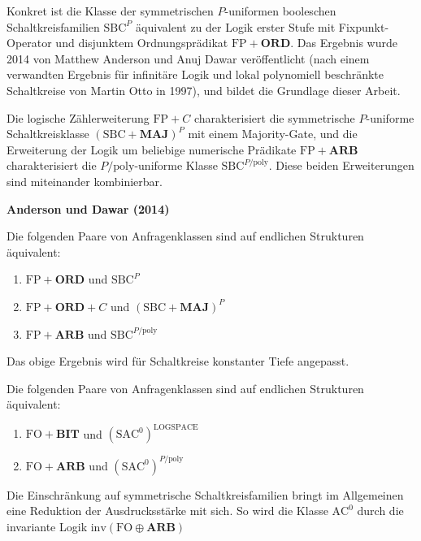 Konkret ist die Klasse der symmetrischen $P$-uniformen booleschen
Schaltkreisfamilien $\mathrm{SBC}^{P}$ äquivalent zu der Logik erster
Stufe mit Fixpunkt-Operator und disjunktem Ordnungsprädikat $\mathrm{FP}+\mathbf{ORD}$.
Das Ergebnis wurde 2014 von Matthew Anderson und Anuj Dawar\cite{AD2014}
veröffentlicht (nach einem verwandten Ergebnis für infinitäre Logik
und lokal polynomiell beschränkte Schaltkreise von Martin Otto in
1997\cite{Otto1997}), und bildet die Grundlage dieser Arbeit.

Die logische Zählerweiterung $\mathrm{FP}+C$ charakterisiert die
symmetrische $P$-uniforme Schaltkreisklasse $\left(\mathrm{SBC}+\mathbf{MAJ}\right)^{P}$
mit einem Majority-Gate, und die Erweiterung der Logik um beliebige
numerische Prädikate $\mathrm{FP}+\mathbf{ARB}$ charakterisiert die
$P/\mathrm{poly}$-uniforme Klasse $\mathrm{SBC}^{P/\mathrm{poly}}$.
Diese beiden Erweiterungen sind miteinander kombinierbar.
\begin{thm}
\textbf{\label{thm:fp}Anderson und Dawar (2014)}

Die folgenden Paare von Anfragenklassen sind auf endlichen Strukturen
äquivalent:

\begin{enumerate}
\item $\mathrm{FP}+\mathbf{ORD}$ und $\mathrm{SBC}^{P}$
\item $\mathrm{FP}+\mathbf{ORD}+C$ und $\left(\mathrm{SBC}+\mathbf{MAJ}\right)^{P}$
\item $\mathrm{FP}+\mathbf{ARB}$ und $\mathrm{SBC}^{P/\mathrm{poly}}$
\end{enumerate}
\end{thm}
Das obige Ergebnis wird für Schaltkreise konstanter Tiefe angepasst.
\begin{thm}
\label{thm:fo}Die folgenden Paare von Anfragenklassen sind auf endlichen
Strukturen äquivalent:

\begin{enumerate}
\item $\mathrm{FO}+\mathbf{BIT}$ und $\left(\mathrm{SAC}^{0}\right)^{\mathrm{LOGSPACE}}$
\item $\mathrm{FO}+\mathbf{ARB}$ und $\left(\mathrm{SAC}^{0}\right)^{P/\mathrm{poly}}$
\end{enumerate}
\end{thm}
Die Einschränkung auf symmetrische Schaltkreisfamilien bringt im Allgemeinen
eine Reduktion der Ausdrucksstärke mit sich. So wird die Klasse $\mathrm{AC}^{0}$
durch die invariante Logik $\mathrm{inv}\left(\mathrm{FO}\oplus\mathbf{ARB}\right)$
